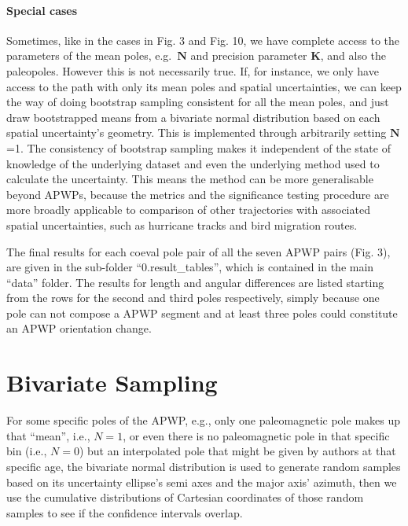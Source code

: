\paragraph{Special cases} Sometimes, like in the cases in Fig. 3 and Fig. 10, we
have complete access to the parameters of the mean poles, e.g.\ $\mathbf{N}$ and
precision parameter $\mathbf{K}$, and also the paleopoles. However this is not
necessarily true. If, for instance, we only have access to the path with only
its mean poles and spatial uncertainties, we can keep the way of doing bootstrap
sampling consistent for all the mean poles, and just draw bootstrapped means
from a bivariate normal distribution based on each spatial uncertainty's
geometry. This is implemented through arbitrarily setting $\mathbf{N}$=1. The
consistency of bootstrap sampling makes it independent of the state of knowledge
of the underlying dataset and even the underlying method used to calculate the
uncertainty. This means the method can be more generalisable beyond APWPs,
because the metrics and the significance testing procedure are more broadly
applicable to comparison of other trajectories with associated spatial
uncertainties, such as hurricane tracks and bird migration routes.

The final results for each coeval pole pair of all the seven APWP pairs (Fig. 3),
are given in the sub-folder ``0.result\_tables'', which is contained in the main
``data'' folder. The results for length and angular differences are listed
starting from the rows for the second and third poles respectively, simply
because one pole can not compose a APWP segment and at least three poles could
constitute an APWP orientation change.

\section{Bivariate Sampling}\label{sec:biv}
For some specific poles of the APWP, e.g., only one paleomagnetic pole makes up
that ``mean'', i.e., $N=1$, or even there is no paleomagnetic pole in that
specific bin (i.e., $N=0$) but an interpolated pole that might be given by
authors at that specific age, the bivariate normal distribution is used to
generate random samples based on its uncertainty ellipse's semi axes and the
major axis' azimuth, then we use the cumulative distributions of Cartesian
coordinates of those random samples to see if the confidence intervals overlap.

